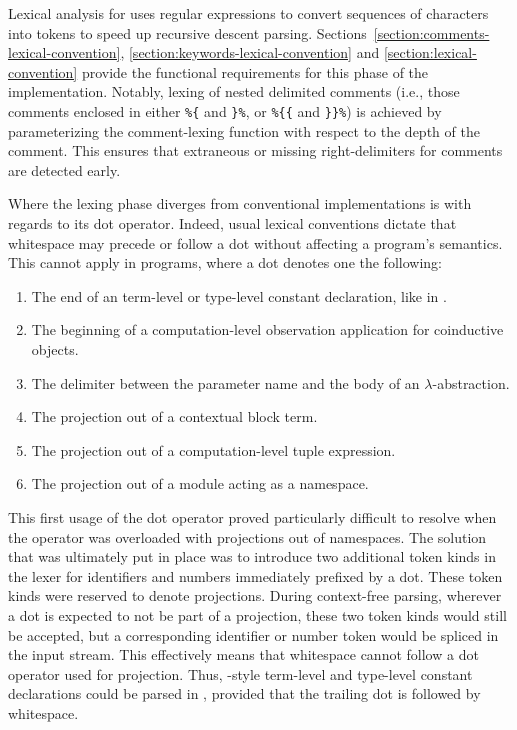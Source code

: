 Lexical analysis for \Beluga uses regular expressions to convert sequences of characters into tokens to speed up recursive descent parsing.
Sections~\ref{section:comments-lexical-convention}, \ref{section:keywords-lexical-convention} and \ref{section:lexical-convention} provide the functional requirements for this phase of the implementation.
Notably, lexing of nested delimited comments (i.e., those comments enclosed in either \verb|%{| and \verb|}%|, or \verb|%{{| and \verb|}}%|) is achieved by parameterizing the comment-lexing function with respect to the depth of the comment.
This ensures that extraneous or missing right-delimiters for comments are detected early.

Where the lexing phase diverges from conventional implementations is with regards to its dot operator.
Indeed, usual lexical conventions dictate that whitespace may precede or follow a dot without affecting a program's semantics.
This cannot apply in \Beluga programs, where a dot denotes one the following:
\begin{enumerate}
\item
The end of an \LF term-level or type-level constant declaration, like in \Twelf.
\item
The beginning of a computation-level observation application for coinductive objects.
\item
The delimiter between the parameter name and the body of an \LF $\lambda$-abstraction.
\item
The projection out of a contextual \LF block term.
\item
The projection out of a computation-level tuple expression.
\item
The projection out of a module acting as a namespace.
\end{enumerate}

This first usage of the dot operator proved particularly difficult to resolve when the operator was overloaded with projections out of namespaces.
The solution that was ultimately put in place was to introduce two additional token kinds in the lexer for identifiers and numbers immediately prefixed by a dot.
These token kinds were reserved to denote projections.
During context-free parsing, wherever a dot is expected to not be part of a projection, these two token kinds would still be accepted, but a corresponding identifier or number token would be spliced in the input stream.
This effectively means that whitespace cannot follow a dot operator used for projection.
Thus, \Twelf-style \LF term-level and type-level constant declarations could be parsed in \Beluga, provided that the trailing dot is followed by whitespace.

